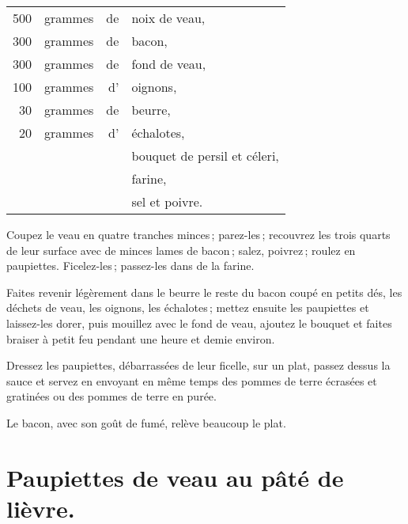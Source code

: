 \footnotesize
\begin{longtable}{rrrp{16em}}
    500 & grammes & de & noix de veau,                                                                    \\
    300 & grammes & de & bacon,                                                                           \\
    300 & grammes & de & fond de veau,                                                                    \\
    100 & grammes & d' & oignons,                                                                         \\
     30 & grammes & de & beurre,                                                                          \\
     20 & grammes & d' & échalotes,                                                                       \\
        &         &    & bouquet de persil et céleri,                                                     \\
        &         &    & farine,                                                                          \\
        &         &    & sel et poivre.                                                                   \\
\end{longtable}
\normalsize

Coupez le veau en quatre tranches minces ; parez-les ; recouvrez les trois
quarts de leur surface avec de minces lames de bacon ; salez, poivrez ; roulez
en paupiettes. Ficelez-les ; passez-les dans de la farine.

Faites revenir légèrement dans le beurre le reste du bacon coupé en petits dés,
les déchets de veau, les oignons, les échalotes ; mettez ensuite les paupiettes
et laissez-les dorer, puis mouillez avec le fond de veau, ajoutez le bouquet et
faites braiser à petit feu pendant une heure et demie environ.

Dressez les paupiettes, débarrassées de leur ficelle, sur un plat, passez
dessus la sauce et servez en envoyant en même temps des pommes de terre
écrasées et gratinées ou des pommes de terre en purée.

Le bacon, avec son goût de fumé, relève beaucoup le plat.

\section*{\centering Paupiettes de veau au pâté de lièvre.}
{}

